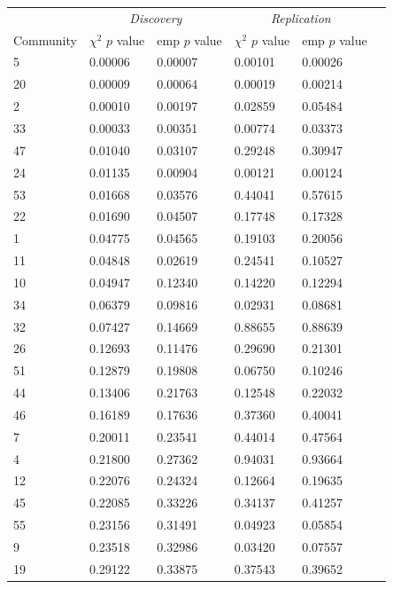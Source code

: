 \begin{table}[ht]
\centering
\setlength{\extrarowheight}{2pt}
\begin{tabular}{llllll}
  \toprule
   &  \multicolumn{2}{c}{\textit{Discovery}} & \multicolumn{2}{c}{\textit{Replication}} \\
   \cmidrule{2-5}
  Community & $\chi^2$ $p$ value  & emp $p$ value  & $\chi^2$ $p$ value   & emp $p$ value   \\ 
  \midrule
5 & 0.00006 & 0.00007 & 0.00101 & 0.00026 \\ 
  20 & 0.00009 & 0.00064 & 0.00019 & 0.00214 \\ 
  2 & 0.00010 & 0.00197 & 0.02859 & 0.05484 \\ 
  33 & 0.00033 & 0.00351 & 0.00774 & 0.03373 \\ 
  47 & 0.01040 & 0.03107 & 0.29248 & 0.30947 \\ 
  24 & 0.01135 & 0.00904 & 0.00121 & 0.00124 \\ 
  53 & 0.01668 & 0.03576 & 0.44041 & 0.57615 \\ 
  22 & 0.01690 & 0.04507 & 0.17748 & 0.17328 \\ 
  1 & 0.04775 & 0.04565 & 0.19103 & 0.20056 \\ 
  11 & 0.04848 & 0.02619 & 0.24541 & 0.10527 \\ 
  10 & 0.04947 & 0.12340 & 0.14220 & 0.12294 \\ 
  34 & 0.06379 & 0.09816 & 0.02931 & 0.08681 \\ 
  32 & 0.07427 & 0.14669 & 0.88655 & 0.88639 \\ 
  26 & 0.12693 & 0.11476 & 0.29690 & 0.21301 \\ 
  51 & 0.12879 & 0.19808 & 0.06750 & 0.10246 \\ 
  44 & 0.13406 & 0.21763 & 0.12548 & 0.22032 \\ 
  46 & 0.16189 & 0.17636 & 0.37360 & 0.40041 \\ 
  7 & 0.20011 & 0.23541 & 0.44014 & 0.47564 \\ 
  4 & 0.21800 & 0.27362 & 0.94031 & 0.93664 \\ 
  12 & 0.22076 & 0.24324 & 0.12664 & 0.19635 \\ 
  45 & 0.22085 & 0.33226 & 0.34137 & 0.41257 \\ 
  55 & 0.23156 & 0.31491 & 0.04923 & 0.05854 \\ 
  9 & 0.23518 & 0.32986 & 0.03420 & 0.07557 \\ 
  19 & 0.29122 & 0.33875 & 0.37543 & 0.39652 \\ 

\end{tabular}
\end{table}
